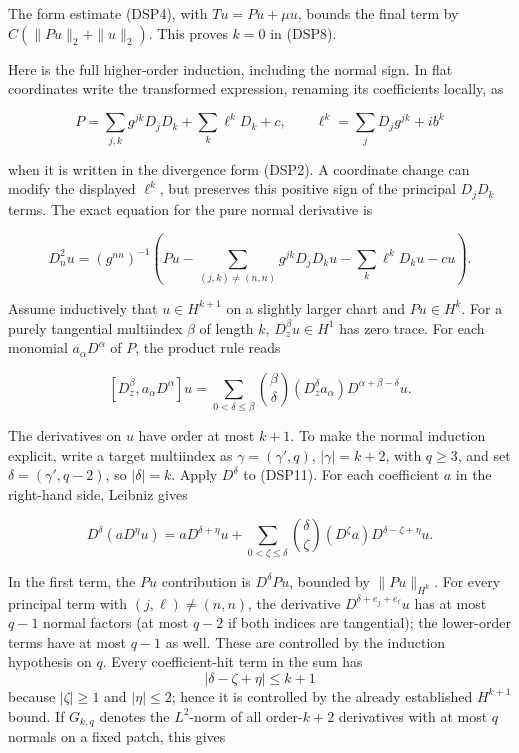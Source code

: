 \documentclass[
  11pt,
]{article}
\begin{document}
The form estimate (DSP4), with \(Tu=Pu+\mu u\), bounds the final term by
\(C(\|Pu\|_2+\|u\|_2)\). This proves \(k=0\) in (DSP8).

Here is the full higher-order induction, including the normal sign. In
flat coordinates write the transformed expression, renaming its
coefficients locally, as

\[
 P=\sum_{j,k}g^{jk}D_jD_k+\sum_k\ell^kD_k+c,
 \qquad \ell^k=\sum_jD_jg^{jk}+ib^k
 \tag{DSP10}
\]

when it is written in the divergence form (DSP2). A coordinate change
can modify the displayed \(\ell^k\), but preserves this positive sign of
the principal \(D_jD_k\) terms. The exact equation for the pure normal
derivative is

\[
 D_n^2u=(g^{nn})^{-1}\left(Pu-
 \sum_{(j,k)\ne(n,n)}g^{jk}D_jD_ku-
 \sum_k\ell^kD_ku-cu\right).
 \tag{DSP11}
\]

Assume inductively that \(u\in H^{k+1}\) on a slightly larger chart and
\(Pu\in H^k\). For a purely tangential multiindex \(\beta\) of length
\(k\), \(D_z^\beta u\in H^1\) has zero trace. For each monomial
\(a_\alpha D^\alpha\) of \(P\), the product rule reads

\[
 [D_z^\beta,a_\alpha D^\alpha]u
 =\sum_{0<\delta\leq\beta}{\beta\choose\delta}
 (D_z^\delta a_\alpha)D^{\alpha+\beta-\delta}u.
 \tag{DSP12}
\]

The derivatives on \(u\) have order at most \(k+1\). To make the normal
induction explicit, write a target multiindex as \(\gamma=(\gamma',q)\),
\(|\gamma|=k+2\), with \(q\ge3\), and set \(\delta=(\gamma',q-2)\), so
\(|\delta|=k\). Apply \(D^\delta\) to (DSP11). For each coefficient
\(a\) in the right-hand side, Leibniz gives

\[
 D^\delta(aD^\eta u)=aD^{\delta+\eta}u+
 \sum_{0<\zeta\le\delta}{\delta\choose\zeta}
 (D^\zeta a)D^{\delta-\zeta+\eta}u . \tag{DSP12a}
\]

In the first term, the \(Pu\) contribution is \(D^\delta Pu\), bounded
by \(\|Pu\|_{H^k}\). For every principal term with \((j,\ell)\ne(n,n)\),
the derivative \(D^{\delta+e_j+e_\ell}u\) has at most \(q-1\) normal
factors (at most \(q-2\) if both indices are tangential); the
lower-order terms have at most \(q-1\) as well. These are controlled by
the induction hypothesis on \(q\). Every coefficient-hit term in the sum
has \[
 |\delta-\zeta+\eta|\le k+1
\] because \(|\zeta|\ge1\) and \(|\eta|\le2\); hence it is controlled by
the already established \(H^{k+1}\) bound. If \(G_{k,q}\) denotes the
\(L^2\)-norm of all order-\(k+2\) derivatives with at most \(q\) normals
on a fixed patch, this gives
\end{document}
